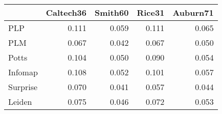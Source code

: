 \begin{tabular}{lrrrr}
\toprule
{} & Caltech36 & Smith60 & Rice31 & Auburn71 \\
\midrule
PLP      &     0.111 &   0.059 &  0.111 &    0.065 \\
PLM      &     0.067 &   0.042 &  0.067 &    0.050 \\
Potts    &     0.104 &   0.050 &  0.090 &    0.054 \\
Infomap  &     0.108 &   0.052 &  0.101 &    0.057 \\
Surprise &     0.070 &   0.041 &  0.057 &    0.044 \\
Leiden   &     0.075 &   0.046 &  0.072 &    0.053 \\
\bottomrule
\end{tabular}
